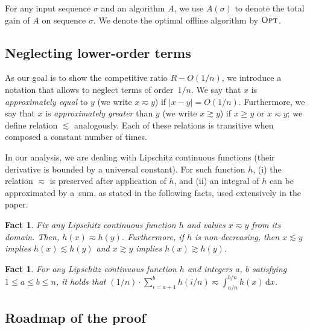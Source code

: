\documentclass[a4paper,USenglish,cleveref]{lipics-v2019}
\newtheorem{fact}[theorem]{Fact}
\newcommand{\R}{\ensuremath{R}}
\newcommand{\dd}{\mathrm{d}}
\newcommand{\OPT}{\textsc{Opt}\xspace}
\begin{document}
For any input sequence $\sigma$ and an algorithm $A$, we use $A(\sigma)$ to denote
the total gain of $A$ on sequence $\sigma$. We denote the optimal offline
algorithm by $\OPT$.



\subsection{Neglecting lower-order terms}

As our goal is to show the competitive ratio $\R - O(1/n)$, we introduce a
notation that allows to neglect terms of order~$1/n$. We say that $x$ is
\emph{approximately equal} to $y$ (we write $x \eqsim y$) if $|x - y| = O(1/n)$.
Furthermore, we say that $x$ is \emph{approximately greater} than $y$ (we write
$x \gtrsim y$) if $x \geq y$ or $x \eqsim y$; we define relation $\lesssim$
analogously. Each of these relations is transitive when composed a
constant number of times.

In our analysis, we are dealing with Lipschitz continuous functions 
(their derivative is bounded by a universal constant). For such function $h$, 
(i) the relation $\eqsim$ is preserved after application of $h$, and (ii) 
an integral of $h$ can be approximated by a~sum, as stated in the following facts,
used extensively in the paper.

\begin{fact}
\label{lem:Lipschitz}
Fix any Lipschitz continuous function $h$ and values $x \eqsim y$ from its domain. 
Then, $h(x) \eqsim h(y)$. Furthermore, if $h$ is non-decreasing, then
$x \lesssim y$ implies $h(x) \lesssim h(y)$
and $x \gtrsim y$ implies $h(x) \gtrsim h(y)$.
\end{fact}

\begin{fact}
\label{lem:sum_int}
For any Lipschitz continuous function $h$ and integers $a$, $b$ satisfying $1
\leq a \leq b \leq n$, it holds that $(1/n) \cdot \sum_{i=a+1}^b h(i/n) \eqsim
\int_{a/n}^{b/n} h(x)\, \dd x$.
\end{fact}


\subsection{Roadmap of the proof}
\end{document}
